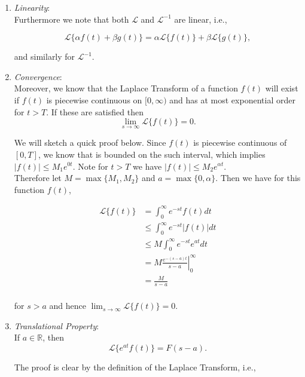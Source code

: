 %
%
\begin{enumerate}
\item \emph{Linearity}:\\
 
Furthermore we note that both $\mathscr{L}$ and $\mathscr{L}^{-1}$ are linear, i.e., 

$$\mathscr{L}\{ \alpha f(t) + \beta g(t) \} = \alpha \mathscr{L}\{ f(t)\} + \beta \mathscr{L}\{ g(t) \},$$

and similarly for $\mathscr{L}^{-1}.$\\

%
%
\item \emph{Convergence}:\\

Moreover, we know that the Laplace Transform of a function $f(t)$ will exist if $f(t)$ is piecewise continuous on $[0,\infty)$ and has at most exponential order for $t>T$. If these are satisfied then $$\lim_{s\rightarrow\infty} \mathscr{L}\{ f(t) \} = 0.$$

We will sketch a quick proof below. Since $f(t)$ is piecewise continuous of $[0,T]$, we know that is bounded on the such interval, which implies $|f(t)| \leq M_1 e^{0t}.$ Note for $t>T$ we have $|f(t)| \leq M_2 e^{\alpha t}$. \\

Therefore let $M=\max\{M_1,M_2\}$ and $a=\max\{0,\alpha\}.$ Then we have for this function $f(t)$, 

\begin{align*}
\mathscr{L}\{ f(t) \}  &= \int_0^\infty e^{-st} f(t) dt \\
&\leq \int_0^\infty e^{-st} |f(t)| dt \\
&\leq M \int_0^\infty e^{-st} e^{at} dt \\
&= M\left. \frac{e^{-(s-a)t} }{s-a} \right|_0^{\infty} \\
&=\frac{M}{s-a} \\
\end{align*}

for $s>a$ and hence $\lim_{s\rightarrow\infty} \mathscr{L}\{ f(t) \} = 0.$

%
%
\item \emph{Translational Property}:\\

If $a\in\mathbb{R}$, then $$\mathscr{L}\{ e^{at} f(t) \} = F(s-a).$$

The proof is clear by the definition of the Laplace Transform, i.e.,


\end{enumerate}
